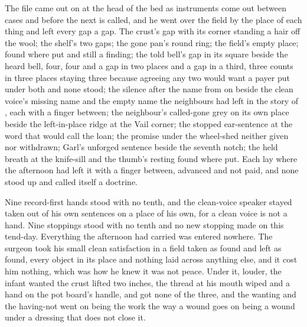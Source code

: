 The file came out on  at the head of the bed as instruments come out between cases and before the next is called, and he went over the field by the place of each thing and left every gap a gap. The crust's gap with its corner standing a hair off the wool; the shelf's two gaps; the gone pan's round ring; the field's empty place;  found where put and still a finding; the told bell's gap in its square beside the heard bell, four, four and a gap in two places and a gap in a third, three counts in three places staying three because agreeing any two would want a payer put under both and none stood; the silence after the name from  on  beside the clean voice's missing name and the empty name the neighbours had left in the story of , each with a finger between; the neighbour's called-gone grey on its own place beside the left-in-place ridge at the Vail corner; the stopped ear-sentence at the word that would call the loan; the promise under the wheel-shed neither given nor withdrawn; Garl's unforged sentence beside the seventh notch; the held breath at the knife-sill and the thumb's resting found where put. Each lay where the afternoon had left it with a finger between, advanced and not paid, and none stood up and called itself a doctrine.

Nine record-first hands stood with no tenth, and the clean-voice speaker stayed taken out of his own sentences on a place of his own, for a clean voice is not a hand. Nine stoppings stood with no tenth and no new stopping made on this tend-day. Everything the afternoon had carried was entered nowhere. The surgeon took his small clean satisfaction in a field taken as found and left as found, every object in its place and nothing laid across anything else, and it cost him nothing, which was how he knew it was not peace. Under it, louder, the infant wanted the crust lifted two inches, the thread at his mouth wiped and a hand on the pot board's handle, and got none of the three, and the wanting and the having-not went on being the work the way a wound goes on being a wound under a dressing that does not close it.

